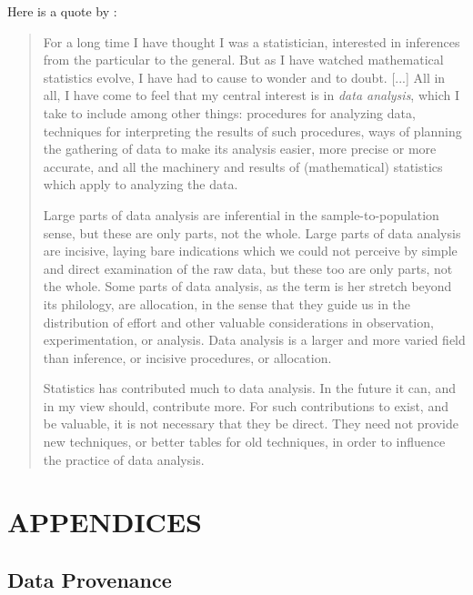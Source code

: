\documentclass[]{article}
\begin{document}
Here is a quote by \citet[pp. 2-3]{Tukey:1962}:

\begin{quote}
For a long time I have thought I was a statistician, interested in inferences from the particular to the general.  But as I have watched mathematical statistics evolve, I have had to cause to wonder and to doubt. [...] All in all, I have come to feel that my central interest is in \emph{data analysis}, which I take to include among other things: procedures for analyzing data, techniques for interpreting the results of such procedures, ways of planning the gathering of data to make its analysis easier, more precise or more accurate, and all the machinery and results of (mathematical) statistics which apply to analyzing the data.

Large parts of data analysis are inferential in the sample-to-population sense, but these are only parts, not the whole.  Large parts of data analysis are incisive, laying bare indications which we could not perceive by simple and direct examination of the raw data, but these too are only parts, not the whole.  Some parts of data analysis, as the term is her stretch beyond its philology, are allocation, in the sense that they guide us in the distribution of effort and other valuable considerations in observation, experimentation, or analysis.  Data analysis is a larger and more varied field than inference, or incisive procedures, or allocation.

Statistics has contributed much to data analysis.  In the future it can, and in my view should, contribute more.  For such contributions to exist, and be valuable, it is not necessary that they be direct.  They need not provide new techniques, or better tables for old techniques, in order to influence the practice of data analysis.
\end{quote}

\newpage



\newpage

\newpage
\section{APPENDICES}
\label{sec:appendix}

\subsection{Data Provenance}
\label{sec:appendix-data-provenance}
\end{document}

